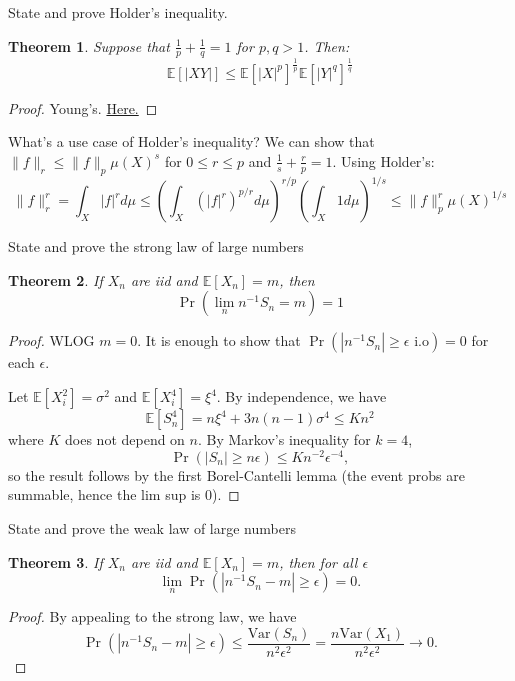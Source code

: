 \documentclass[avery5388,grid,frame]{flashcards}
\newcommand{\E}{\mathbb{E}}
\newcommand{\Var}{\text{Var}}
\newtheorem*{theorem}{Theorem}
\begin{document}
\begin{flashcard}
    {State and prove Holder's inequality.}
    \begin{theorem}
        Suppose that $\frac 1 p + \frac 1 q = 1$ for $p,q>1$. Then:
        $$\E[|XY|] \leq \E[|X|^p]^{\frac 1 p} \E[|Y|^q]^{\frac 1 q}$$
    \end{theorem}

    \begin{proof}
        Young's. \href{https://en.wikipedia.org/wiki/H%C3%B6lder%27s_inequality#Proof_of_H%C3%B6lder's_inequality}{Here.}
    \end{proof}
\end{flashcard}


\begin{flashcard}
    {What's a use case of Holder's inequality?}
    We can show that $\| f \|_r \leq \| f \|_p \mu(X)^s$ for $0 \leq r \leq p$ and $\frac 1 s + \frac r p = 1$. Using Holder's:
    $$\| f \|_r^r = \int_X |f|^r d\mu \leq \left( \int_X (|f|^r)^{p/r} d\mu \right )^{r/p} \left ( \int_X 1 d\mu \right )^{1/s} \leq \| f \|_p^r \mu(X)^{1/s}$$
\end{flashcard}


\begin{flashcard}
    {State and prove the strong law of large numbers}
    \begin{theorem}
        If $X_n$ are iid and $\E[X_n] = m$, then
        $$\Pr(\lim_n n^{-1} S_n = m) = 1$$
    \end{theorem}

    \begin{proof}
        WLOG $m=0$. It is enough to show that $\Pr(|n^{-1} S_n| \geq \epsilon \text{ i.o}) = 0$ for each $\epsilon$.

        Let $\E[X_i^2] = \sigma^2$ and $\E[X_i^4] = \xi^4$. By independence, we have
        $$\E[S_n^4] = n \xi^4 + 3n(n-1) \sigma^4 \leq K n^2$$
        where $K$ does not depend on $n$. By Markov's inequality for $k=4$,
        $$\Pr(|S_n| \geq n \epsilon) \leq K n^{-2} \epsilon^{-4},$$
        so the result follows by the first Borel-Cantelli lemma (the event probs are summable, hence the lim sup is $0$).
    \end{proof}
\end{flashcard}


\begin{flashcard}
    {State and prove the weak law of large numbers}
    \begin{theorem}
        If $X_n$ are iid and $\E[X_n] = m$, then for all $\epsilon$
        $$\lim_n \Pr(| n^{-1} S_n - m| \geq \epsilon) = 0.$$
    \end{theorem}

    \begin{proof}
        By appealing to the strong law, we have
        $$\Pr(| n^{-1} S_n - m| \geq \epsilon) \leq \frac{\Var(S_n)}{n^2 \epsilon^2} = \frac{n \Var(X_1)}{n^2 \epsilon^2} \rightarrow 0.$$
    \end{proof}
\end{flashcard}
\end{document}
